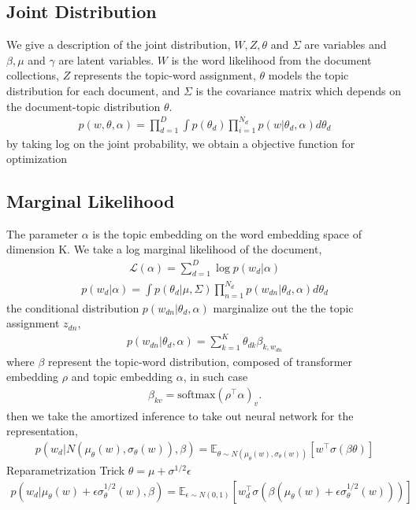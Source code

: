 \subsection{Joint Distribution}
We give a description of the joint distribution, $ W,Z,\theta $ and $ \Sigma $ are variables and $ \beta, \mu $ and $ \gamma $ are latent variables. $ W $ is the word likelihood from the document collections, $ Z $ represents the topic-word assignment, $ \theta $ models the topic distribution for each document, and $ \Sigma $ is the covariance matrix which depends on the document-topic distribution $ \theta $.
\begin{align*}
p(w,\theta,\alpha)=\prod_{d=1}^{D}\int p(\theta_d)\prod_{i=1}^{N_d}p(w|\theta_d,\alpha)d\theta_d
\end{align*}
by taking  log on the joint probability, we obtain a objective function for optimization
\subsection{Marginal Likelihood}
The parameter $ \alpha $ is the topic embedding on the word embedding space of dimension K. We take a log marginal likelihood of the document,
\begin{align*}
\mathcal{L}(\alpha)=\sum_{d=1}^{D}\log p(w_d|\alpha)
\end{align*}
\begin{align*}
p(w_d|\alpha)=\int p(\theta_d|\mu,\Sigma)\prod_{n=1}^{N_d}p(w_{dn}|\theta_d,\alpha)d\theta_d
\end{align*}
the conditional distribution $ p(w_{dn}|\theta_d,\alpha) $ marginalize out the the topic assignment $ z_{dn} $,
\begin{align*}
p(w_{dn}|\theta_d,\alpha)=\sum_{k=1}^{K}\theta_{dk}\beta_{k,w_{dn}}
\end{align*}
where $ \beta $ represent the topic-word distribution, composed of transformer embedding $ \rho $ and topic embedding $ \alpha $, in such case
\begin{align*}
\beta_{kv}=\text{softmax}(\rho^\top\alpha)_{v}.
\end{align*}
then we take the amortized inference to take out neural network for the representation,
\begin{align*}
p(w_{d}|N(\mu_\theta(w),\sigma_\theta(w)),\beta)=\mathbb{E}_{\theta\sim N(\mu_\theta(w),\sigma_\theta(w))}\left[w^\top\sigma(\beta\theta)\right]
\end{align*}
Reparametrization Trick $ \theta=\mu+\sigma^{1/2}\epsilon $\\
\begin{align*}
p(w_{d}|\mu_\theta(w)+\epsilon\sigma^{1/2}_\theta(w),\beta)=\mathbb{E}_{\epsilon\sim N(0,1)}\left[w_d^\top\sigma(\beta(\mu_\theta(w)+\epsilon\sigma^{1/2}_\theta(w)))\right]
\end{align*}